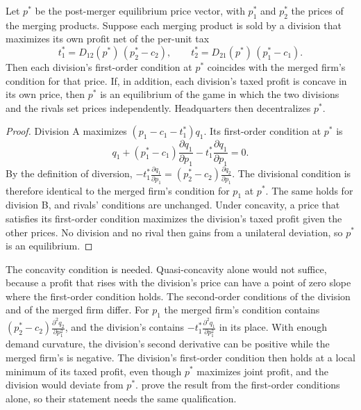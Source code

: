 \begin{proposition}\label{prop:11-fs2}
Let $p^*$ be the post-merger equilibrium price vector, with $p_1^*$ and $p_2^*$ the prices of the merging products.
Suppose each merging product is sold by a division that maximizes its own profit net of the per-unit tax
\begin{equation}\label{eq:11-fs-tstar}
  t_1^* = D_{12}(p^*)\,(p_2^* - c_2) , \qquad t_2^* = D_{21}(p^*)\,(p_1^* - c_1) .
\end{equation}
Then each division's first-order condition at $p^*$ coincides with the merged firm's condition for that price. If,
in addition, each division's taxed profit is concave in its own price, then $p^*$ is an equilibrium of the
game in which the two divisions and the rivals set prices independently. Headquarters then decentralizes $p^*$.
\end{proposition}

\begin{proof}
Division A maximizes $(p_1 - c_1 - t_1^*)q_1$. Its first-order condition at $p^*$ is
\begin{equation*}
  q_1 + (p_1^* - c_1)\frac{\partial q_1}{\partial p_1} - t_1^* \frac{\partial q_1}{\partial p_1} = 0 .
\end{equation*}
By the definition of diversion, $-t_1^* \frac{\partial q_1}{\partial p_1} = (p_2^* - c_2)\frac{\partial q_2}{\partial
p_1}$. The divisional condition is therefore identical to the merged firm's condition for $p_1$ at $p^*$. The same
holds for division B, and rivals' conditions are unchanged. Under concavity, a price that satisfies its
first-order condition maximizes the division's taxed profit given the other prices. No division and no rival then
gains from a unilateral deviation, so $p^*$ is an equilibrium.
\end{proof}

The concavity condition is needed. Quasi-concavity alone would not suffice, because a profit that rises with the
division's price can have a point of zero slope where the first-order condition holds. The second-order conditions of the division and of the merged firm differ.
For $p_1$ the merged firm's condition contains $(p_2^* - c_2)\frac{\partial^2 q_2}{\partial p_1^2}$, and the
division's contains $-t_1^*\frac{\partial^2 q_1}{\partial p_1^2}$ in its place. With enough demand curvature, the
division's second derivative can be positive while the merged firm's is negative. The division's first-order
condition then holds at a local minimum of its taxed profit, even though $p^*$ maximizes joint profit, and the
division would deviate from $p^*$. \citet{FarrellShapiro2010} prove the result from the first-order conditions
alone, so their statement needs the same qualification.

